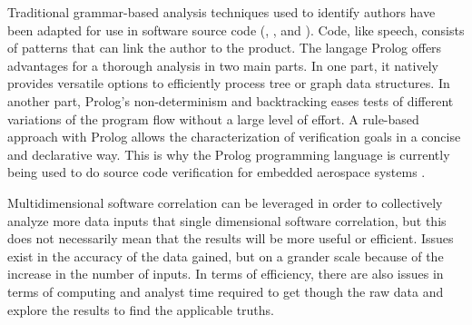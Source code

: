 \documentclass[12pt]{report}
\begin{document}
Traditional grammar-based analysis techniques used to identify authors have been adapted for use in software source code (\cite{kustanto2009automatic}, \cite{lesner2010novel}, and \cite{jadalla2008pde4java}).  Code, like speech, consists of patterns that can link the author to the product.  The langage Prolog offers advantages for a thorough analysis in two main parts.  In one part, it natively provides versatile options to efficiently process tree or graph data structures.   In another part, Prolog’s non-determinism and backtracking eases tests of different variations of the program flow without a large level of effort.  A rule-based approach with Prolog allows the characterization of verification goals in a concise and declarative way.  This is why the Prolog programming language is currently being used to do source code verification for embedded aerospace systems \cite{flederer2017source}.  

Multidimensional software correlation can be leveraged in order to collectively analyze more data inputs that single dimensional software correlation, but this does not necessarily mean that the results will be more useful or efficient.  Issues exist in the accuracy of the data gained, but on a grander scale because of the increase in the number of inputs.  In terms of efficiency, there are also issues in terms of computing and analyst time required to get though the raw data and explore the results to find the applicable truths.  
\end{document}
